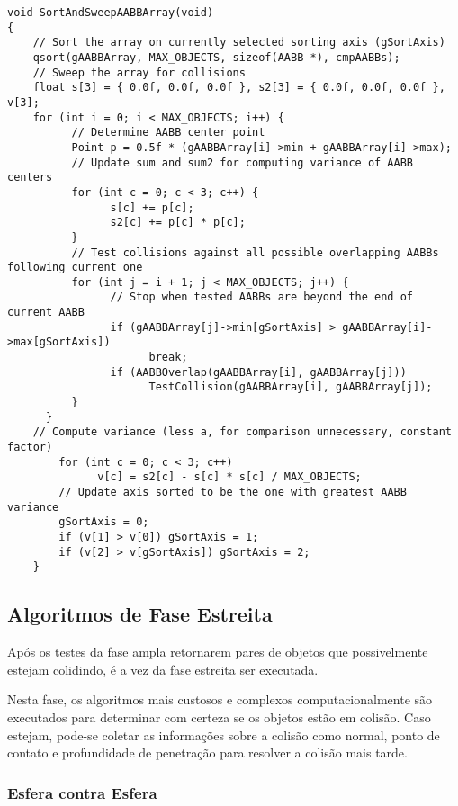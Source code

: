\begin{lstlisting}[frame=single,caption=Exemplo de ordenar e varrer\label{code:SortAndSweep}]
void SortAndSweepAABBArray(void)
{
    // Sort the array on currently selected sorting axis (gSortAxis)
    qsort(gAABBArray, MAX_OBJECTS, sizeof(AABB *), cmpAABBs);
    // Sweep the array for collisions
    float s[3] = { 0.0f, 0.0f, 0.0f }, s2[3] = { 0.0f, 0.0f, 0.0f }, v[3];
    for (int i = 0; i < MAX_OBJECTS; i++) {
          // Determine AABB center point
          Point p = 0.5f * (gAABBArray[i]->min + gAABBArray[i]->max);
          // Update sum and sum2 for computing variance of AABB centers
          for (int c = 0; c < 3; c++) {
                s[c] += p[c];
                s2[c] += p[c] * p[c];
          }
          // Test collisions against all possible overlapping AABBs following current one
          for (int j = i + 1; j < MAX_OBJECTS; j++) {
                // Stop when tested AABBs are beyond the end of current AABB
                if (gAABBArray[j]->min[gSortAxis] > gAABBArray[i]->max[gSortAxis])
                      break;
                if (AABBOverlap(gAABBArray[i], gAABBArray[j]))
                      TestCollision(gAABBArray[i], gAABBArray[j]);
          }
      }
    // Compute variance (less a, for comparison unnecessary, constant factor)
        for (int c = 0; c < 3; c++)
              v[c] = s2[c] - s[c] * s[c] / MAX_OBJECTS;
        // Update axis sorted to be the one with greatest AABB variance
        gSortAxis = 0;
        if (v[1] > v[0]) gSortAxis = 1;
        if (v[2] > v[gSortAxis]) gSortAxis = 2;
    }
\end{lstlisting}

\subsection{Algoritmos de Fase Estreita}

Após  os testes da fase ampla retornarem pares de objetos que possivelmente
estejam colidindo, é a vez da fase estreita ser executada.

Nesta fase, os algoritmos mais custosos e complexos computacionalmente são
executados para determinar com certeza se os objetos estão em colisão.
Caso estejam, pode-se coletar as informações sobre a colisão como normal, ponto
de contato e profundidade de penetração para resolver a colisão mais tarde.

\subsubsection{Esfera contra Esfera}

